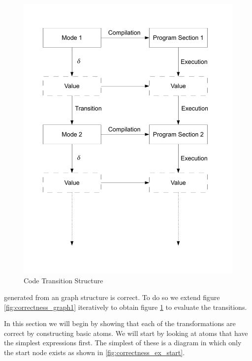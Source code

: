 \begin{figure}[htb]
    \centering
    \includegraphics[trim= 10mm 30mm 10mm 10mm, clip, width=\imgmedium]{./images/correctness_graph2.pdf}
    \caption{Code Transition Structure}
    \label{fig:correctness_graph2}
\end{figure}
generated from an graph structure is correct. To do so we extend figure \ref{fig:correctness_graph1} iteratively to obtain figure \ref{fig:correctness_graph2} to evaluate the transitions.

In this section we will begin by showing that each of the transformations are correct by constructing basic atoms. We will start by looking at atoms that have the simplest expressions first. The simplest of these is a diagram in which only the start node exists as shown in \ref{fig:correctness_ex_start}.

